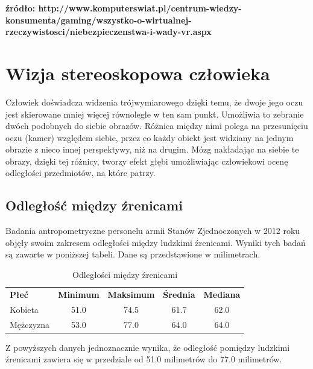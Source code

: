 \documentclass[a4paper,11pt,twoside]{report}
\theoremstyle{definition}
\begin{document}
\textbf {źródło: http://www.komputerswiat.pl/centrum-wiedzy-konsumenta/gaming/wszystko-o-wirtualnej-rzeczywistosci/niebezpieczenstwa-i-wady-vr.aspx }

\section{Wizja stereoskopowa człowieka}

Człowiek doświadcza widzenia trójwymiarowego dzięki temu, że dwoje jego oczu jest skierowane mniej więcej równolegle w ten sam punkt. Umożliwia to zebranie dwóch podobnych do siebie obrazów. Różnica między nimi polega na przesunięciu oczu (kamer) względem siebie, przez co każdy obiekt jest widziany na jednym obrazie z nieco innej perspektywy, niż na drugim. Mózg nakładając na siebie te obrazy, dzięki tej różnicy, tworzy efekt głębi umożliwiając człowiekowi ocenę odległości przedmiotów, na które patrzy.

\subsection{Odległość między źrenicami}

Badania antropometryczne personelu armii Stanów Zjednoczonych w 2012 roku objęły swoim zakresem odległości między ludzkimi źrenicami. Wyniki tych badań są zawarte w poniższej tabeli. Dane są przedstawione w milimetrach.

\begin{table}[h!]
\centering
\label{my-label}
\begin{tabular}{lcccc}
\textbf{Płeć} & \multicolumn{1}{l}{\textbf{Minimum}} & \multicolumn{1}{l}{\textbf{Maksimum}} & \multicolumn{1}{l}{\textbf{Średnia}} & \multicolumn{1}{l}{\textbf{Mediana}} \\
Kobieta       & 51.0                                 & 74.5                                  & 61.7                                 & 62.0                                 \\
Mężczyzna     & 53.0                                 & 77.0                                  & 64.0                                 & 64.0                                
\end{tabular}
\caption{Odległości między źrenicami}
\end{table}

Z powyższych danych jednoznacznie wynika, że odległość pomiędzy ludzkimi źrenicami zawiera się w przedziale od 51.0 milimetrów do 77.0 milimetrów.
\end{document}
